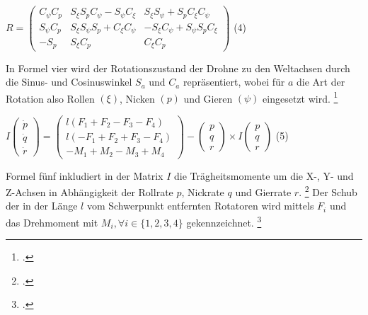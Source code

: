\begin{description}
    \item \begin{center} $R = \begin{pmatrix} C_{\psi}C_{p} & S_{\xi}S_{p}C_{\psi} - S_{\psi}C_{\xi} & S_{\xi}S_{\psi}+S_{p}C_{\xi}C_{\psi} \\ S_{\psi}C_{p} & S_{\xi}S_{\psi}S_{p} + C_{\xi}C_{\psi} &  -S_{\xi}C_{\psi} + S_{\psi}S_{p}C_{\xi}\\ -S_{p} & S_{\xi}C_{p} & C_{\xi}C_{p} \end{pmatrix}$ (4)\end{center}
\end{description}
In Formel vier wird der Rotationszustand der Drohne zu den Weltachsen durch die Sinus- und Cosinuswinkel $S_{a}$ und $C_{a}$ repräsentiert, wobei für $a$ die Art der Rotation also Rollen $(\xi)$, Nicken $(p)$ und Gieren $(\psi)$ eingesetzt wird. \footcite[Vgl.][S. 2]{Deshpande.2021}
\begin{description}
    \item \begin{center} $I\begin{pmatrix} \dot p \\ \dot q \\ \dot r\end{pmatrix} = \begin{pmatrix} l(F_{1} + F_{2} - F_{3} - F_{4}) \\ l(-F_{1} + F_{2} + F_{3} - F_{4}) \\ -M_{1} + M_{2} - M_{3} + M_{4}\end{pmatrix} - \begin{pmatrix} p \\ q \\ r \end{pmatrix} \times I\begin{pmatrix} p \\ q \\ r \end{pmatrix}$ (5)\end{center}
\end{description}
Formel fünf inkludiert in der Matrix $I$ die Trägheitsmomente um die X-, Y- und Z-Achsen in Abhängigkeit der Rollrate $p$, Nickrate $q$ und Gierrate $r$. \footcite[Vgl.][S. 2]{Deshpande.2021}
Der Schub der in der Länge $l$ vom Schwerpunkt entfernten Rotatoren wird mittels $F_{i}$ und das Drehmoment mit $M_{i}, \forall i \in \{1,2,3,4\}$ gekennzeichnet. \footcite[Vgl.][S. 3]{Deshpande.2020}

